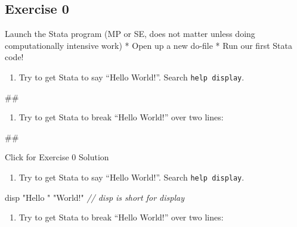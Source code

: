 \documentclass[
]{book}
\newenvironment{Shaded}{\begin{snugshade}}{\end{snugshade}}
\newcommand{\CommentTok}[1]{\textcolor[rgb]{0.56,0.35,0.01}{\textit{#1}}}
\newcommand{\NormalTok}[1]{#1}
\newcommand{\StringTok}[1]{\textcolor[rgb]{0.31,0.60,0.02}{#1}}
\providecommand{\tightlist}{%
  \setlength{\itemsep}{0pt}\setlength{\parskip}{0pt}}
\begin{document}
\hypertarget{exercise-0-5}{%
\subsection{Exercise 0}\label{exercise-0-5}}

Launch the Stata program (MP or SE, does not matter unless doing computationally intensive work)
* Open up a new do-file
* Run our first Stata code!

\begin{enumerate}
\def\labelenumi{\arabic{enumi}.}
\tightlist
\item
  Try to get Stata to say ``Hello World!''. Search \texttt{help\ display}.
\end{enumerate}

\begin{Shaded}
\begin{Highlighting}[]
\NormalTok{\#\#}
\end{Highlighting}
\end{Shaded}

\begin{enumerate}
\def\labelenumi{\arabic{enumi}.}
\setcounter{enumi}{1}
\tightlist
\item
  Try to get Stata to break ``Hello World!'' over two lines:
\end{enumerate}

\begin{Shaded}
\begin{Highlighting}[]
\NormalTok{\#\#}
\end{Highlighting}
\end{Shaded}

{Click for Exercise 0 Solution}

\begin{enumerate}
\def\labelenumi{\arabic{enumi}.}
\tightlist
\item
  Try to get Stata to say ``Hello World!''. Search \texttt{help\ display}.
\end{enumerate}

\begin{Shaded}
\begin{Highlighting}[]
\NormalTok{disp }\StringTok{"Hello "} \StringTok{"World!"} \CommentTok{// \textquotesingle{}disp\textquotesingle{} is short for \textquotesingle{}display\textquotesingle{}}
\end{Highlighting}
\end{Shaded}

\begin{enumerate}
\def\labelenumi{\arabic{enumi}.}
\setcounter{enumi}{1}
\tightlist
\item
  Try to get Stata to break ``Hello World!'' over two lines:
\end{enumerate}
\end{document}
